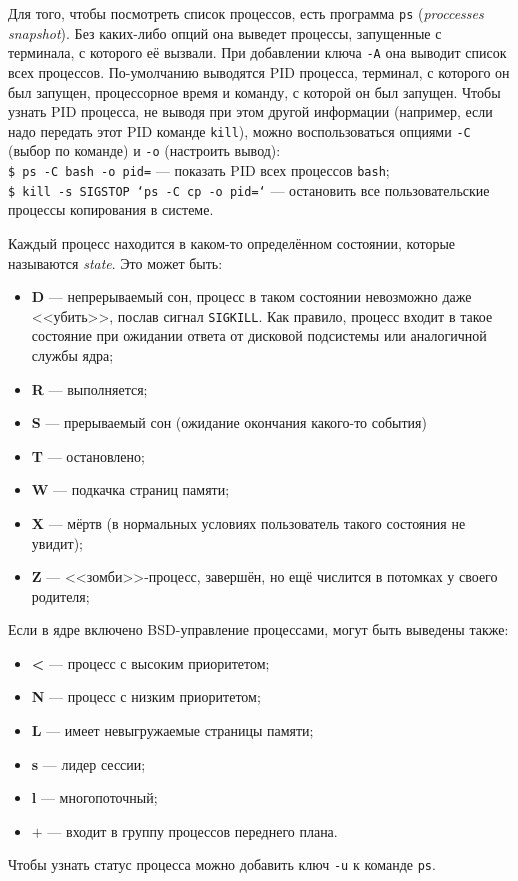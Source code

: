 Для того, чтобы посмотреть список процессов, есть программа \texttt{ps} (\emph{proccesses snapshot}). Без каких-либо опций она выведет процессы, запущенные с терминала, с которого её вызвали. При добавлении ключа \texttt{-A} она выводит список всех процессов. По-умолчанию выводятся PID процесса, терминал, с которого он был запущен, процессорное время и команду, с которой он был запущен.
Чтобы узнать PID процесса, не выводя при этом другой информации (например, если надо передать этот PID команде \texttt{kill}), можно воспользоваться опциями \texttt{-C} (выбор по команде) и \texttt{-o} (настроить вывод):\\
\texttt{\$ ps -C bash -o pid=} --- показать PID всех процессов \texttt{bash};\\
\texttt{\$ kill -s SIGSTOP `ps -C cp -o pid=`} --- остановить все пользовательские процессы копирования в системе.

Каждый процесс находится в каком-то определённом состоянии, которые называются \emph{state}. Это может быть:
\begin{itemize}
 \item \textbf{D} --- непрерываемый сон, процесс в таком состоянии невозможно даже <<убить>>, послав сигнал \texttt{SIGKILL}. Как правило, процесс входит в такое состояние при ожидании ответа от дисковой подсистемы или аналогичной службы ядра;
 \item \textbf{R} --- выполняется;
 \item \textbf{S} --- прерываемый сон (ожидание окончания какого-то события)
 \item \textbf{T} --- остановлено;
 \item \textbf{W} --- подкачка страниц памяти;
 \item \textbf{X} --- мёртв (в нормальных условиях пользователь такого состояния не увидит);
 \item \textbf{Z} --- <<зомби>>-процесс, завершён, но ещё числится в потомках у своего родителя;
\end{itemize}
Если в ядре включено BSD-управление процессами, могут быть выведены также:
\begin{itemize}
 \item \textbf{<} --- процесс с высоким приоритетом;
 \item \textbf{N} --- процесс с низким приоритетом;
 \item \textbf{L} --- имеет невыгружаемые страницы памяти;
 \item \textbf{s} --- лидер сессии;
 \item \textbf{l} --- многопоточный;
 \item \textbf{$+$} --- входит в группу процессов переднего плана.
\end{itemize}
Чтобы узнать статус процесса можно добавить ключ \texttt{-u} к команде \texttt{ps}.

